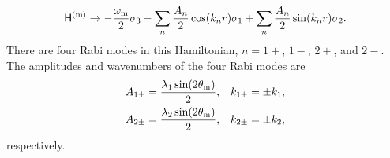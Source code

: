 \begin{equation}
  \mathsf H^{(\mm)} \to - \frac{\omega_\mm}{2}\sigma_3  - \sum_{n}\frac{A_n}{2} \cos(k_n r)  \sigma_1 + \sum_n\frac{A_n}{2} \sin(k_n r) \sigma_2.
  \label{eq-hamiltonian-bg-matter-basis-multi-frequency-drop-varying-sigma3}
\end{equation}
There are four Rabi modes in this Hamiltonian, $n=1+$, $1-$, $2+$, and $2-$. The amplitudes and wavenumbers of the four Rabi modes are
\begin{align}
    A_{1\pm} &= \frac{\lambda_1 \sin (2\theta_\mathrm m)}{2}, & k_{1\pm} &= \pm k_1, \\
    A_{2\pm} &= \frac{\lambda_2 \sin (2\theta_\mathrm m)}{2}, & k_{2\pm} &= \pm k_2,
\end{align}
respectively.

